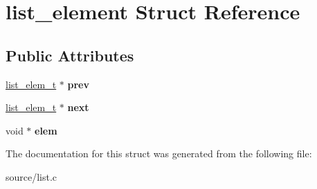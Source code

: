 \hypertarget{structlist__element}{}\section{list\+\_\+element Struct Reference}
\label{structlist__element}
\subsection*{Public Attributes}
\begin{DoxyCompactItemize}
\item 
\hyperlink{structlist__element}{list\+\_\+elem\+\_\+t} $\ast$ {\bfseries prev}\hypertarget{structlist__element_adb57c714f0bd52ab9dba43e256f820fe}{}\label{structlist__element_adb57c714f0bd52ab9dba43e256f820fe}

\item 
\hyperlink{structlist__element}{list\+\_\+elem\+\_\+t} $\ast$ {\bfseries next}\hypertarget{structlist__element_aa254ab6a478b1d0382b787d6fae20fc4}{}\label{structlist__element_aa254ab6a478b1d0382b787d6fae20fc4}

\item 
void $\ast$ {\bfseries elem}\hypertarget{structlist__element_ae36b2ef72a92f1113a178c4899139a53}{}\label{structlist__element_ae36b2ef72a92f1113a178c4899139a53}

\end{DoxyCompactItemize}


The documentation for this struct was generated from the following file\+:\begin{DoxyCompactItemize}
\item 
source/list.\+c\end{DoxyCompactItemize}
